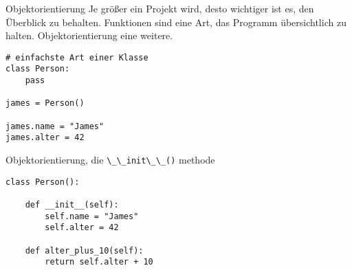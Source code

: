 \begin{frame}[fragile]{Objektorientierung}
Je größer ein Projekt wird, desto wichtiger ist es, den Überblick 
zu behalten. Funktionen sind eine Art, das Programm übersichtlich zu halten.
Objektorientierung eine weitere.
\pause{}

\begin{lstlisting}
# einfachste Art einer Klasse
class Person:
    pass

james = Person()

james.name = "James"
james.alter = 42
\end{lstlisting}
\end{frame}

\begin{frame}[fragile]{Objektorientierung, die \lstinline{\_\_init\_\_()} methode}

\begin{lstlisting}
class Person():

    def __init__(self):
        self.name = "James"
        self.alter = 42

    def alter_plus_10(self):
        return self.alter + 10

\end{lstlisting}
\end{frame}




